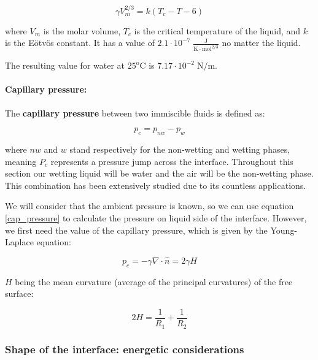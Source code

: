 \begin{equation} 
\gamma V_m^{2/3}=k\left(T_{c}-T-6\right)
\label{eotvos}
\end{equation}

where $V_m$ is the molar volume, $T_c$ is the critical temperature of the liquid, and $k$ is the Eötvös constant. It has a value of $2.1\cdot 10^{-7} \; \frac{\textrm{J}}{\textrm{K} \cdot \textrm{mol}^{\textrm{2/3}}}$ no matter the liquid.

The resulting value for water at $25^\textrm{o} \textrm{C}$ is $7.17 \cdot 10^{-2} \; \textrm{N/m}$.

\paragraph{Capillary pressure:}

The \textbf{capillary pressure} between two immiscible fluids is defined as:

\begin{equation} 
	p_c = p_{nw} - p_{w}
	\label{cap_pressure}
\end{equation}

where $nw$ and $w$ stand respectively for the non-wetting and wetting phases, meaning $P_c$ represents a pressure jump across the interface. Throughout this section our wetting liquid will be water and the air will be the non-wetting phase. This combination has been extensively studied due to its countless applications.

We will consider that the ambient pressure is known, so we can use equation \ref{cap_pressure} to calculate the pressure on liquid side of the interface. However, we first need the value of the capillary pressure, which is given by the Young-Laplace equation:

\begin{equation} 
p_c = -\gamma \nabla \cdot \hat{n} = 2 \gamma H
\label{young_laplace}
\end{equation}

$H$ being the mean curvature (average of the principal curvatures) of the free surface:

\begin{equation} 
2H = \frac{1}{R_1} + \frac{1}{R_2}
\label{curvature}
\end{equation}

\subsubsection{Shape of the interface: energetic considerations}


